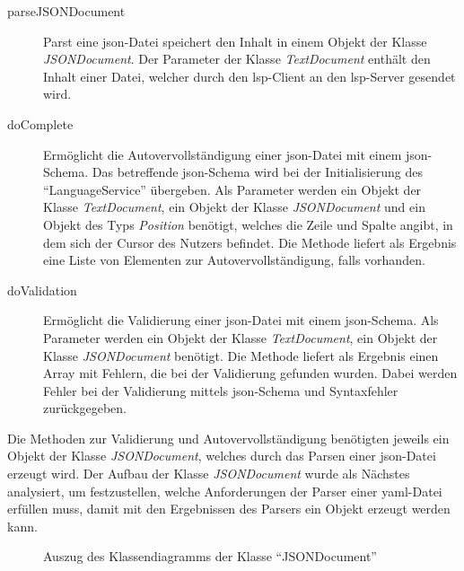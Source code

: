 \begin{description}
      \item[parseJSONDocument]
            Parst eine \ac{json}-Datei speichert den Inhalt in einem Objekt der Klasse \textit{JSONDocument}.
            Der Parameter der Klasse \textit{TextDocument} enthält den Inhalt einer Datei, welcher durch den \ac{lsp}-Client an den \ac{lsp}-Server gesendet wird.
      \item[doComplete]
            Ermöglicht die Autovervollständigung einer \ac{json}-Datei mit einem \ac{json}-Schema. Das betreffende \ac{json}-Schema wird bei der
            Initialisierung des ``LanguageService'' übergeben.
            Als Parameter werden ein Objekt der Klasse \textit{TextDocument}, ein Objekt der Klasse \textit{JSONDocument} und ein Objekt
            des Typs \textit{Position} benötigt, welches die Zeile und Spalte angibt, in dem sich der Cursor des Nutzers befindet.
            Die Methode liefert als Ergebnis eine Liste von Elementen zur Autovervollständigung, falls vorhanden.
      \item[doValidation] Ermöglicht die Validierung einer \ac{json}-Datei mit einem \ac{json}-Schema.
            Als Parameter werden ein Objekt der Klasse \textit{TextDocument}, ein Objekt der Klasse \textit{JSONDocument} benötigt.
            Die Methode liefert als Ergebnis einen Array mit Fehlern, die bei der Validierung gefunden wurden.
            Dabei werden Fehler bei der Validierung mittels \ac{json}-Schema und Syntaxfehler zurückgegeben.
\end{description}

Die Methoden zur Validierung und Autovervollständigung benötigten jeweils ein Objekt der Klasse \textit{JSONDocument}, welches durch das Parsen einer
\ac{json}-Datei erzeugt wird.
Der Aufbau der Klasse \textit{JSONDocument} wurde als Nächstes analysiert, um festzustellen, welche Anforderungen der Parser einer \ac{yaml}-Datei
erfüllen muss, damit mit den Ergebnissen des Parsers ein Objekt erzeugt werden kann.

\begin{figure}[htp] %
      \centering
      \caption{Auszug des Klassendiagramms der Klasse ``JSONDocument''}
      \label{fig:class-diagram-json-document-excerpt}
\end{figure}

